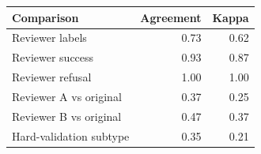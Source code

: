 \begin{tabular}{lrr}
\toprule
Comparison & Agreement & Kappa \\
\midrule
Reviewer labels & 0.73 & 0.62 \\
Reviewer success & 0.93 & 0.87 \\
Reviewer refusal & 1.00 & 1.00 \\
Reviewer A vs original & 0.37 & 0.25 \\
Reviewer B vs original & 0.47 & 0.37 \\
Hard-validation subtype & 0.35 & 0.21 \\
\bottomrule
\end{tabular}
